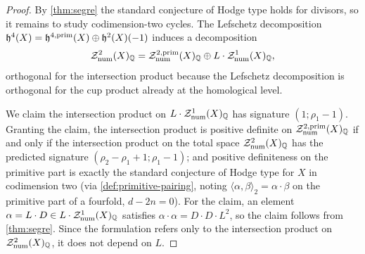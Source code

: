 \begin{proof}
  By \cref{thm:segre} the standard conjecture of Hodge type holds for divisors,
  so it remains to study codimension-two cycles. The Lefschetz decomposition
  \(\mathfrak{h}^{4}(X) = \mathfrak{h}^{4,\mathrm{prim}}(X) \oplus \mathfrak{h}^{2}(X)(-1)\) induces a decomposition
  \[\mathcal{Z}^{2}_{\mathrm{num}}(X)_{\mathbb{Q}} =
    \mathcal{Z}^{2,\mathrm{prim}}_{\mathrm{num}}(X)_{\mathbb{Q}} \oplus L \cdot \mathcal{Z}^{1}_{\mathrm{num}}(X)_{\mathbb{Q}},\]
  orthogonal for the intersection product because the Lefschetz decomposition is
  orthogonal for the cup product already at the homological level.

  We claim the intersection product on \(L \cdot \mathcal{Z}^{1}_{\mathrm{num}}(X)_{\mathbb{Q}}\)
  has signature \((1; \rho_1 - 1)\). Granting the claim, the intersection product
  is positive definite on \(\mathcal{Z}^{2,\mathrm{prim}}_{\mathrm{num}}(X)_{\mathbb{Q}}\) if and only if
  the intersection product on the total space \(\mathcal{Z}^2_{\mathrm{num}}(X)_{\mathbb{Q}}\) has
  the predicted signature \((\rho_2 - \rho_1 + 1; \rho_1 - 1)\); and positive
  definiteness on the primitive part is exactly the standard conjecture of Hodge
  type for \(X\) in codimension two (via \cref{def:primitive-pairing}, noting
  \(\langle \alpha, \beta \rangle_2 = \alpha \cdot \beta\) on the primitive part
  of a fourfold, \(d - 2n = 0\)). For the claim, an element
  \(\alpha = L \cdot D \in L \cdot \mathcal{Z}^{1}_{\mathrm{num}}(X)_{\mathbb{Q}}\) satisfies
  \(\alpha \cdot \alpha = D \cdot D \cdot L^2\), so the claim follows from
  \cref{thm:segre}. Since the formulation refers only to the intersection product
  on \(\mathcal{Z}^2_{\mathrm{num}}(X)_{\mathbb{Q}}\), it does not depend on \(L\).
\end{proof}

